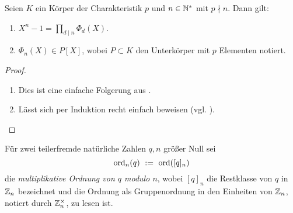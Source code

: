 \begin{satz}
  \label{satz:zerfall_xn_1}
  Seien $K$ ein Körper der Charakteristik $p$ und $n \in \mathbb{N}^\ast$ mit $p\nmid
  n$. Dann gilt:
  \begin{enumerate}
    \item $X^n-1 = \prod_{d\mid n} \Phi_d(X)$.
    \item $\Phi_n(X) \in P[X]$, wobei $P\subset K$ den Unterkörper mit $p$
      Elementen notiert.
  \end{enumerate}
\end{satz}
\begin{proof}
  \begin{enumerate}
    \item Dies ist eine einfache Folgerung aus .
    \item Lässt sich per Induktion recht einfach beweisen 
      (vgl. \autocite[Theorem 2.45 (ii)]{lidl1997finite}).
  \end{enumerate}
\end{proof}


\begin{definition}
  Für zwei teilerfremde natürliche Zahlen $q,n$ größer Null sei
  \[ \operatorname{ord}_n(q) \ :=\  \operatorname{ord}([q]_n)\]
  die \emph{multiplikative Ordnung von $q$ modulo $n$},
  wobei $[q]_n$ die Restklasse von $q$ in $\mathbb{Z}_n$ bezeichnet und 
  die Ordnung als Gruppenordnung in den Einheiten von $\mathbb{Z}_n$, notiert 
  durch $\mathbb{Z}_n^\times$, zu lesen ist.
\end{definition}

